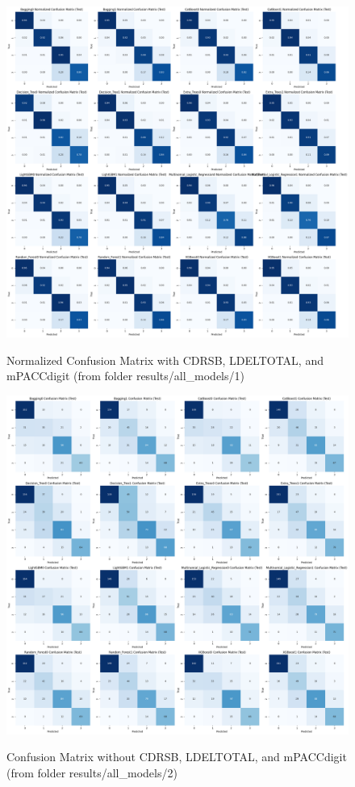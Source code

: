 \newpage

\begin{figure}[H]
	\centering
	\includegraphics[width=1\textwidth]{images/1_Confusion_Matrix_Normalized.png}
	\label{fig:Normalized Confusion Matrix with CDRSB, LDELTOTAL, and mPACCdigit}
	\caption{Normalized Confusion Matrix with CDRSB, LDELTOTAL, and mPACCdigit (from folder results/all\_models/1)}
\end{figure}

\newpage

\begin{figure}[H]
	\centering
	\includegraphics[width=1\textwidth]{images/2_Confusion_Matrix.png}
	\label{fig:Confusion Matrix without CDRSB, LDELTOTAL, and mPACCdigit}
	\caption{Confusion Matrix without CDRSB, LDELTOTAL, and mPACCdigit (from folder results/all\_models/2)}
\end{figure} 

